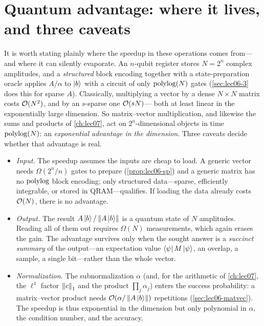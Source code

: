 \section{Quantum advantage: where it lives, and three caveats}
\label{sec:lec06-advantage}

It is worth stating plainly where the speedup in these operations comes from---and
where it can silently evaporate. An $n$-qubit register stores $N=2^n$ complex
amplitudes, and a \emph{structured} block encoding together with a state-preparation
oracle applies $A/\alpha$ to $\ket{b}$ with a circuit of only $\operatorname{polylog}(N)$ gates
(\cref{sec:lec06-3} does this for sparse $A$). Classically, multiplying a vector by a
dense $N\times N$ matrix costs $\mathcal{O}(N^2)$, and by an $s$-sparse one $\mathcal{O}(sN)$---
both at least linear in the exponentially large dimension. So matrix--vector
multiplication, and likewise the sums and products of \cref{ch:lec07}, act on
$2^n$-dimensional objects in time $\operatorname{polylog}(N)$: an \emph{exponential advantage in the
dimension}. Three caveats decide whether that advantage is real.

\begin{itemize}[leftmargin=1.4em,nosep]
  \item \emph{Input.} The speedup assumes the inputs are cheap to load. A generic
        vector needs $\Omega(2^n/n)$ gates to prepare (\cref{prop:lec06-sp}) and a
        generic matrix has no $\operatorname{polylog}$ block encoding; only structured
        data---sparse, efficiently integrable, or stored in QRAM---qualifies. If
        loading the data already costs $\mathcal{O}(N)$, there is no advantage.
  \item \emph{Output.} The result $A\ket{b}/\left\lVert A\ket{b} \right\rVert$ is a quantum state of
        $N$ amplitudes. Reading all of them out requires $\Omega(N)$ measurements,
        which again erases the gain. The advantage survives only when the sought
        answer is a \emph{succinct summary} of the output---an expectation value
        $\bra{\psi}M\ket{\psi}$, an overlap, a sample, a single bit---rather than the
        whole vector.
  \item \emph{Normalization.} The subnormalization $\alpha$ (and, for the arithmetic
        of \cref{ch:lec07}, the $\ell^1$ factor $\left\lVert c \right\rVert_1$ and the product
        $\prod_j\alpha_j$) enters the success probability: a matrix--vector product
        needs $\mathcal{O}(\alpha/\left\lVert A\ket{b} \right\rVert)$ repetitions
        (\cref{sec:lec06-matvec}). The speedup is thus exponential in the dimension
        but only polynomial in $\alpha$, the condition number, and the accuracy.
\end{itemize}

